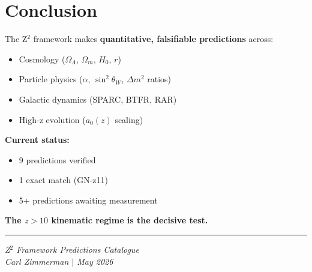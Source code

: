 \documentclass[12pt,a4paper]{article}
\begin{document}
\section{Conclusion}

The Z$^2$ framework makes \textbf{quantitative, falsifiable predictions} across:
\begin{itemize}
\item Cosmology ($\Omega_\Lambda$, $\Omega_m$, $H_0$, $r$)
\item Particle physics ($\alpha$, $\sin^2\theta_W$, $\Delta m^2$ ratios)
\item Galactic dynamics (SPARC, BTFR, RAR)
\item High-z evolution ($a_0(z)$ scaling)
\end{itemize}

\textbf{Current status:}
\begin{itemize}
\item 9 predictions verified
\item 1 exact match (GN-z11)
\item 5+ predictions awaiting measurement
\end{itemize}

\textbf{The $z > 10$ kinematic regime is the decisive test.}

\vspace{1cm}
\hrule
\vspace{0.5cm}
\textit{Z$^2$ Framework Predictions Catalogue}\\
\textit{Carl Zimmerman $|$ May 2026}
\end{document}
